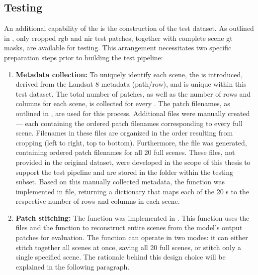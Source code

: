 {

\subsection{Testing}
\label{subsec:testing}

An additional capability of the  is the construction of the test dataset.
As outlined in , only cropped \gls{rgb} and \gls{nir} test patches, together with complete scene \gls{gt} masks, are available for testing.
This arrangement necessitates two specific preparation steps prior to building the test pipeline:

\begin{enumerate}
    \item \textbf{Metadata collection:} To uniquely identify each scene, the  is introduced, derived from the Landsat 8 metadata (path/row),
    and is unique within this test dataset. The total number of patches, as well as the number of rows and columns for each scene, is collected for every .
    The patch filenames, as outlined in , are used for this process.
    Additional  files were manually created --- each containing the ordered patch filenames corresponding to every full scene.
    Filenames in these  files are organized in the order resulting from cropping (left to right, top to bottom).
    Furthermore, the  file was generated, containing ordered patch filenames for all 20 full scenes.
    These  files, not provided in the original dataset,
    were developed in the scope of this thesis to support the test pipeline and are stored in the  folder within the testing subset.
    Based on this manually collected metadata, the  function was implemented in  file,
    returning a dictionary that maps each of the 20 s to the respective number of rows and columns in each scene.
    \item \textbf{Patch stitching:} The  function was implemented in .
    This function uses the  files and the  function to reconstruct entire scenes from the model's output patches for evaluation.
    The function can operate in two modes: it can either stitch together all scenes at once, saving all 20 full scenes,
    or stitch only a single specified scene. The rationale behind this design choice will be explained in the following paragraph.
\end{enumerate}

}
